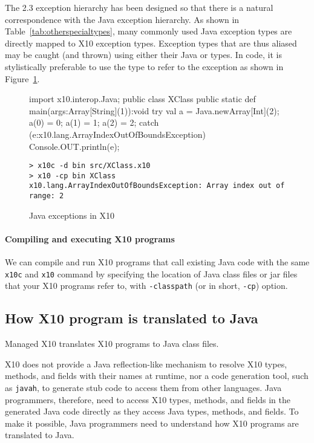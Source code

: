 The \Xten{} 2.3 exception hierarchy has been designed so that there is a
natural correspondence with the Java exception hierarchy. As shown in
Table~\ref{tab:otherspecialtypes}, many commonly used Java
exception types are directly mapped to X10 exception types. 
Exception types that are thus aliased may be caught (and thrown) using
either their Java or \Xten types.  In \Xten code, it is stylistically
preferable to use the \Xten type to refer to the exception as shown in 
Figure~\ref{fig:javaexceptions}.

\begin{figure}
\begin{xten}
import x10.interop.Java;
public class XClass {   
  public static def main(args:Array[String](1)):void {
    try {
      val a = Java.newArray[Int](2);
      a(0) = 0;
      a(1) = 1;
      a(2) = 2;
    } catch (e:x10.lang.ArrayIndexOutOfBoundsException) {
      Console.OUT.println(e);
    }
  }
}
\end{xten}
\begin{verbatim}
> x10c -d bin src/XClass.x10
> x10 -cp bin XClass
x10.lang.ArrayIndexOutOfBoundsException: Array index out of range: 2
\end{verbatim}
\caption{Java exceptions in X10}
\label{fig:javaexceptions}
\end{figure}

\paragraph{Compiling and executing X10 programs}

We can compile and run X10 programs that call existing Java code with
the same \verb|x10c| and \verb|x10| command by specifying the location
of Java class files or jar files that your X10 programs refer to, with
\verb|-classpath| (or in short, \verb|-cp|) option.

\subsection{How X10 program is translated to Java}

Managed X10 translates X10 programs to Java class files. 

X10 does not provide a Java reflection-like mechanism to resolve X10
types, methods, and fields with their names at runtime, nor a code
generation tool, such as \verb|javah|, to generate stub code to access
them from other languages.  Java programmers, therefore, need to
access X10 types, methods, and fields in the generated Java code
directly as they access Java types, methods, and fields.  To make it
possible, Java programmers need to understand how X10 programs are
translated to Java.

